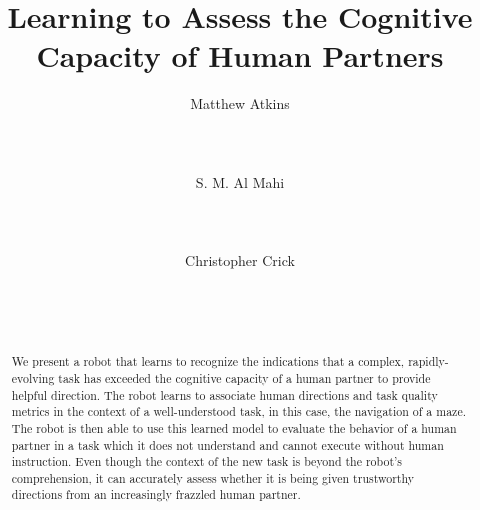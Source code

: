\documentclass{sig-alternate}
\begin{document}
\title{Learning to Assess the Cognitive Capacity of Human Partners}


\author{
%
\alignauthor
Matthew Atkins\\
       \\
       \\
       \\
\alignauthor
S. M. Al Mahi\\
       \\
       \\
       \\
\alignauthor Christopher Crick\\
       \\
       \\
       \\
}

\maketitle
\begin{abstract} 
We present a robot that learns to recognize the indications that a
complex, rapidly-evolving task has exceeded the cognitive capacity of
a human partner to provide helpful direction.  The robot learns to
associate human directions and task quality metrics in the context of
a well-understood task, in this case, the navigation of a maze.  The
robot is then able to use this learned model to evaluate the behavior
of a human partner in a task which it does not understand and cannot
execute without human instruction.  Even though the context of the new
task is beyond the robot's comprehension, it can accurately assess
whether it is being given trustworthy directions from an increasingly
frazzled human partner.
\end{abstract}



\end{document}
